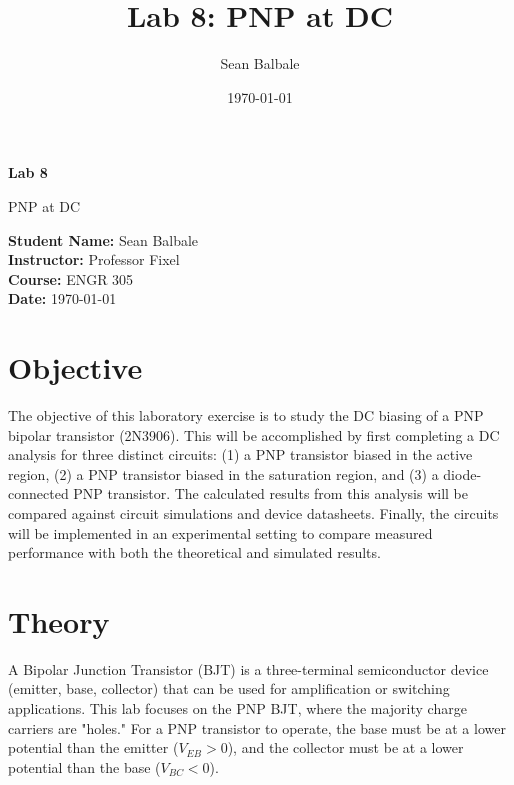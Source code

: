 \documentclass[12pt]{article}
\title{Lab 8: PNP at DC}
\author{Sean Balbale}
\date{\today} %
\begin{document}
\begin{titlepage}
  \begin{center}
    \vspace*{1in}

    \Huge
    \textbf{Lab 8}

    \LARGE
    \vspace{0.5cm}
    PNP at DC

    \vspace{3in}

    \textbf{Student Name:} Sean Balbale
    \\ \textbf{Instructor:} Professor Fixel
    \\ \textbf{Course:} ENGR 305
    \\ \textbf{Date:} \today %

    \vfill
  \end{center}
\end{titlepage}

\newpage



\section{Objective}
The objective of this laboratory exercise is to study the DC biasing of a PNP bipolar transistor (2N3906). This will be accomplished by first completing a DC analysis for three distinct circuits: (1) a PNP transistor biased in the active region, (2) a PNP transistor biased in the saturation region, and (3) a diode-connected PNP transistor. The calculated results from this analysis will be compared against circuit simulations and device datasheets. Finally, the circuits will be implemented in an experimental setting to compare measured performance with both the theoretical and simulated results.

\section{Theory}
A Bipolar Junction Transistor (BJT) is a three-terminal semiconductor device (emitter, base, collector) that can be used for amplification or switching applications. This lab focuses on the PNP BJT, where the majority charge carriers are "holes." For a PNP transistor to operate, the base must be at a lower potential than the emitter ($V_{EB} > 0$), and the collector must be at a lower potential than the base ($V_{BC} < 0$).
\end{document}
